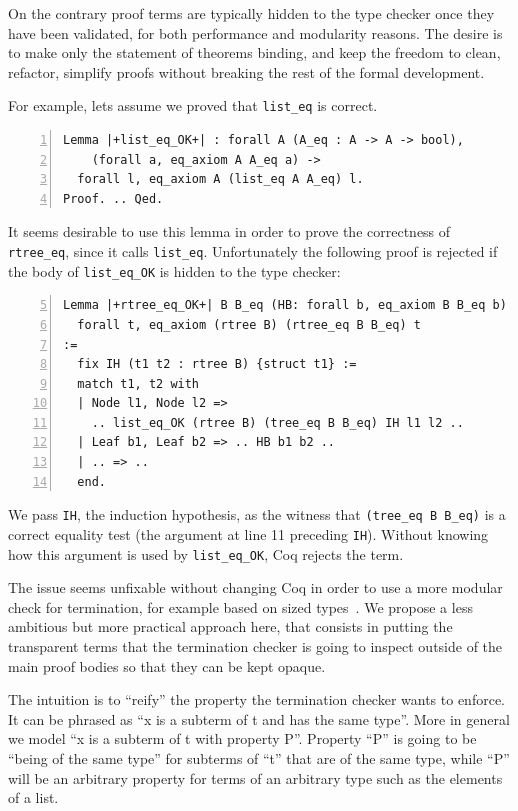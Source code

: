 \documentclass[sigplan,10pt,review]{acmart}\settopmatter{printfolios=true,printccs=false,printacmref=false}
\begin{document}
On the contrary proof terms are typically hidden to the type checker once
they have been validated, for both performance and modularity reasons.
The desire is to make only the statement of theorems binding, and keep
the freedom to clean, refactor, simplify proofs without breaking
the rest of the formal development. 

For example, lets assume we proved that \lstinline+list_eq+ is
correct.

\begin{minipage}{\textwidth}\begin{lstlisting}[numbers=left]
Lemma |+list_eq_OK+| : forall A (A_eq : A -> A -> bool),
    (forall a, eq_axiom A A_eq a) ->
  forall l, eq_axiom A (list_eq A A_eq) l.
Proof. .. Qed.
\end{lstlisting}\end{minipage}

\noindent
It seems desirable to use this lemma in order to prove the
correctness of \lstinline+rtree_eq+, since it calls
\lstinline+list_eq+.
Unfortunately the following proof is rejected if the body of
\lstinline+list_eq_OK+ is hidden to the type checker:

\begin{minipage}{\textwidth}\begin{lstlisting}[numbers=left,firstnumber=5]
Lemma |+rtree_eq_OK+| B B_eq (HB: forall b, eq_axiom B B_eq b) :
  forall t, eq_axiom (rtree B) (rtree_eq B B_eq) t
:= 
  fix IH (t1 t2 : rtree B) {struct t1} :=
  match t1, t2 with
  | Node l1, Node l2 =>
    .. list_eq_OK (rtree B) (tree_eq B B_eq) IH l1 l2 ..
  | Leaf b1, Leaf b2 => .. HB b1 b2 ..
  | .. => ..
  end.
\end{lstlisting}\end{minipage}

\noindent
We pass \lstinline+IH+, the induction hypothesis, as the
witness that \lstinline+(tree_eq B B_eq)+ is a correct equality test
(the argument at line 11 preceding \lstinline+IH+). 
Without knowing how this argument is used
by \lstinline+list_eq_OK+, Coq rejects the term.

The issue seems unfixable without changing Coq in order to use a more
modular check for termination, for example based on sized
types~\cite{sacchini:pastel-00622429}.
We propose a less ambitious but more practical approach here, that
consists in putting the transparent terms that the termination checker
is going to inspect outside of the main proof bodies so that they can be 
kept opaque.

The intuition is to ``reify'' the property the termination checker wants
to enforce. It can be phrased as ``x is a subterm of t and has the same
type''. More in general we model ``x is a subterm of t with property
P''. Property ``P'' is going to be ``being of the same type'' 
for subterms of ``t'' that are of the same type, while ``P'' 
will be an arbitrary property for terms of an arbitrary type such 
as the elements of a list.
\end{document}
